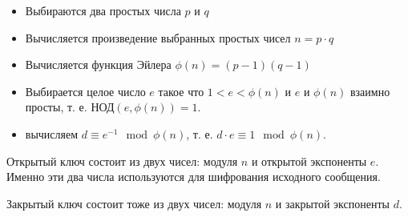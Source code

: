\begin{itemize}
\item Выбираются два простых числа $p$ и $q$
\item Вычисляется произведение выбранных простых чисел $n = p\cdot q$
\item Вычисляется функция Эйлера 
\(
\phi\left(n\right)=\left(p - 1 \right)\left(q - 1 \right)
\)
\item Выбирается целое число $e$ такое что 
\(
1 < e < \phi\left(n\right)
\) и $e$ и $\phi\left(n\right)$ взаимно просты,
т. е. 
\(
\mbox{НОД}\left( e, \phi\left(n\right) \right) = 1.
\)
\item вычисляем $d \equiv e^{-1} \mod{\phi\left(n\right)}$, т. е.
$d \cdot e \equiv 1 \mod{\phi\left(n\right)}$.
\end{itemize}

Открытый ключ состоит из двух чисел: модуля $n$ и открытой экспоненты
$e$. Именно эти два числа используются для шифрования исходного
сообщения.

Закрытый ключ состоит тоже из двух чисел: модуля $n$ и закрытой экспоненты
$d$.

